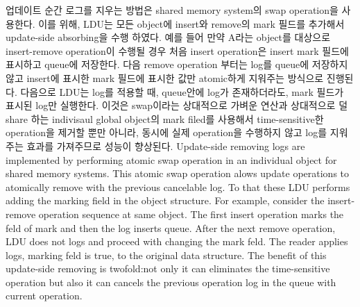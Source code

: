 \ifkor
업데이트 순간 로그를 지우는 방법은 shared memory system의 swap operation을 사용한다.
이를 위해, LDU는 모든 object에 insert와 remove의 mark 필드를 추가해서 update-side
absorbing을 수행 하였다.
예를 들어 만약 A라는 object를 대상으로 insert-remove operation이 수행될 경우 처음 insert operation은
insert mark 필드에 표시하고 queue에 저장한다.
다음 remove operation 부터는 log를 queue에 저장하지 않고 insert에 표시한 mark 필드에 표시한 값만
atomic하게 지워주는 방식으로 진행된다.
다음으로 LDU는 log를 적용할 때, queue안에 log가 존재하더라도, mark 필드가 표시된 log만 실행한다.
이것은 swap이라는 상대적으로 가벼운 연산과 상대적으로 덜 share 하는 indivisaul global object의 mark filed를
사용해서 time-sensitive한 operation을 제거할 뿐만 아니라, 동시에 실제 operation을 수행하지 않고 log를 지워주는
효과를 가져주므로 성능이 향상된다. 
\else
Update-side removing logs are implemented by performing atomic swap operation
in an individual object for shared memory systems.
This atomic swap operation alows update operations to atomically remove with the
previous cancelable log.
To that these LDU performs adding the marking field in the object structure.
For example, consider the insert-remove operation sequence at same object.
The first insert operation marks the feld of mark and then the log inserts
queue.
After the next remove operation, LDU does not logs and proceed with changing
the mark feld.
The reader applies logs, marking feld is true, to the original data structure.
The benefit of this update-side removing is twofold:not only it can eliminates
the time-sensitive operation but also it can cancels the previous operation log
in the queue with current operation.
\fi

